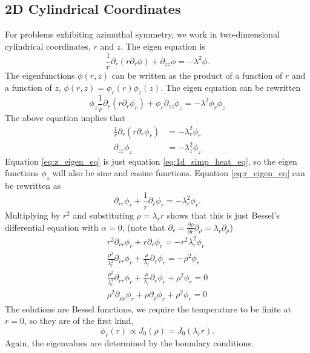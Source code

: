 \documentclass[letterpaper,12pt]{article}
\begin{document}
\subsection{2D Cylindrical Coordinates}
For problems exhibiting azimuthal symmetry, we work in two-dimensional cylindrical coordinates, $r$ and $z$. The eigen
equation is
\begin{equation}
  \frac{1}{r} \partial_r (r \partial_r \phi) + \partial_{zz} \phi = -\lambda^2 \phi.
\end{equation}
The eigenfunctions $\phi(r,z)$ can be written as the product of a function of $r$ and a function of $z$, $\phi(r,z) = \phi_r(r) \phi_z(z)$.
The eigen equation can be rewritten
\begin{equation}
  \phi_z \frac{1}{r} \partial_r (r \partial_r \phi_r) + \phi_r \partial_{zz} \phi_z =
  -\lambda^2 \phi_r\phi_z
\end{equation}
The above equation implies that
\begin{align}
 \label{eq:r_eigen_eq}
 \frac{1}{r} \partial_r (r \partial_r \phi_r)&= -\lambda_r^2 \phi_r \\
 \label{eq:z_eigen_eq}
                        \partial_{zz} \phi_z &= -\lambda_z^2 \phi_z
\end{align}
Equation \ref{eq:z_eigen_eq} is just equation \ref{eq:1d_simp_heat_eq}, so the eigen functions $\phi_z$ will also be sine and
cosine functions. Equation \ref{eq:r_eigen_eq} can be rewritten as
\begin{equation}
 \partial_{rr} \phi_r + \frac{1}{r} \partial_r \phi_r = -\lambda_r^2 \phi_r.
\end{equation}
Multiplying by $r^2$ and substituting $\rho  = \lambda_r r$ shows that this is just Bessel's differential equation with $\alpha = 0$,
(note that $\partial_r = \frac{\partial \rho}{\partial r} \partial_\rho = \lambda_r \partial_\rho$)
\begin{align}
 r^2\partial_{rr} \phi_r + r \partial_r \phi_r = -r^2 \lambda_r^2 \phi_r \\
 \frac{\rho^2}{\lambda_r^2} \partial_{ r   r  } \phi_r + \frac{\rho}{\lambda_r} \partial_r    \phi_r = -\rho^2 \phi_r \\
 \frac{\rho^2}{\lambda_r^2} \partial_{ r   r  } \phi_r + \frac{\rho}{\lambda_r} \partial_r    \phi_r + \rho^2 \phi_r = 0 \\
       \rho^2             \partial_{\rho\rho} \phi_r +       \rho           \partial_\rho \phi_r + \rho^2 \phi_r = 0
\end{align}
The solutions are Bessel functions, we require the temperature to be finite at $r=0$, so they are of the first kind,
\begin{equation}
  \phi_r(r) \propto J_0(\rho) = J_0(\lambda_r r).
\end{equation}
Again, the eigenvalues are determined by the boundary conditions.
\end{document}
